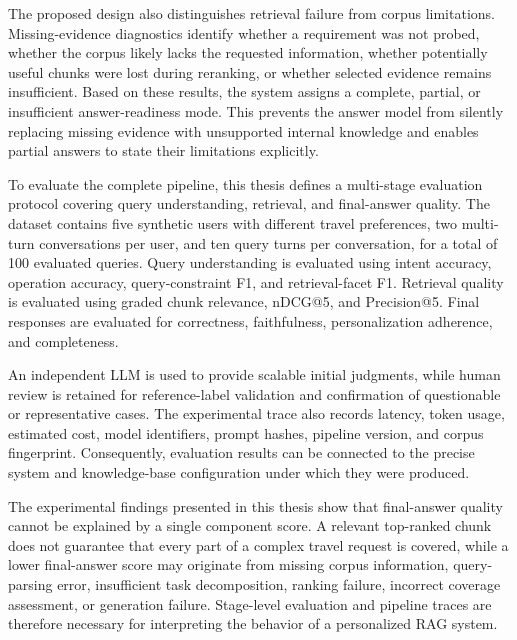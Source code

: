 The proposed design also distinguishes retrieval failure from corpus
limitations. Missing-evidence diagnostics identify whether a requirement was
not probed, whether the corpus likely lacks the requested information, whether
potentially useful chunks were lost during reranking, or whether selected
evidence remains insufficient. Based on these results, the system assigns a
complete, partial, or insufficient answer-readiness mode. This prevents the
answer model from silently replacing missing evidence with unsupported internal
knowledge and enables partial answers to state their limitations explicitly.

To evaluate the complete pipeline, this thesis defines a multi-stage evaluation
protocol covering query understanding, retrieval, and final-answer quality.
The dataset contains five synthetic users with different travel preferences,
two multi-turn conversations per user, and ten query turns per conversation,
for a total of 100 evaluated queries. Query understanding is evaluated using
intent accuracy, operation accuracy, query-constraint F1, and retrieval-facet
F1. Retrieval quality is evaluated using graded chunk relevance, nDCG@5, and
Precision@5. Final responses are evaluated for correctness, faithfulness,
personalization adherence, and completeness.

An independent LLM is used to provide scalable initial judgments, while human
review is retained for reference-label validation and confirmation of
questionable or representative cases. The experimental trace also records
latency, token usage, estimated cost, model identifiers, prompt hashes,
pipeline version, and corpus fingerprint. Consequently, evaluation results can
be connected to the precise system and knowledge-base configuration under
which they were produced.

The experimental findings presented in this thesis show that final-answer
quality cannot be explained by a single component score. A relevant top-ranked
chunk does not guarantee that every part of a complex travel request is
covered, while a lower final-answer score may originate from missing corpus
information, query-parsing error, insufficient task decomposition, ranking
failure, incorrect coverage assessment, or generation failure. Stage-level
evaluation and pipeline traces are therefore necessary for interpreting the
behavior of a personalized RAG system.


